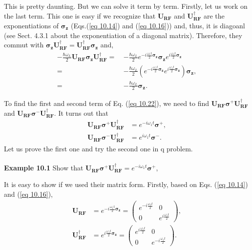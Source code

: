 \documentclass{article}
\begin{document}
This is pretty daunting. But we can solve it term by term. Firstly, let us work on the last
term. This one is easy if we recognize that $\boldsymbol{U_{RF}}$ and $\boldsymbol{U}^\dagger_{\boldsymbol{RF}}$
are the exponentiations of $\boldsymbol{\sigma_z}$ (Eqs.(\ref{eq 10.14}) and (\ref{eq 10.16})) and, thus, it is diagoanl
(see Sect. 4.3.1 about the exponentiation of a diagonal matrix). Therefore, they commut
with $\boldsymbol{\sigma_z}\boldsymbol{U}^\dagger_{\boldsymbol{RF}}=\boldsymbol{U}^\dagger_{\boldsymbol{RF}}\boldsymbol{\sigma_z}$
and,
\begin{align*}\label{eq 10.23}
    -\frac{\hbar\omega_L}{2}\boldsymbol{U_{RF}\sigma_z}\boldsymbol{U}^\dagger_{\boldsymbol{RF}}=\ &
    -\frac{\hbar\omega_L}{2}e^{-i\frac{\omega_1t}{2}\boldsymbol{\sigma_z}}\boldsymbol{\sigma_z}e^{i\frac{\omega_1t}{2}\boldsymbol{\sigma_z}}\\
    =\ &-\frac{\hbar\omega_L}{2}\left(e^{-i\frac{\omega_1t}{2}\boldsymbol{\sigma_z}}e^{i\frac{\omega_1t}{2}\boldsymbol{\sigma_z}}\right)\boldsymbol{\sigma_z},\\
    =\ & -\frac{\hbar\omega_L}{2}\boldsymbol{\sigma_z}.\tag{10.23}
\end{align*}

To find the first and second term of Eq. (\ref{eq 10.22}), we need to find 
$\boldsymbol{U_{RF}\sigma^+}\boldsymbol{U}^\dagger_{\boldsymbol{RF}}$ and
$\boldsymbol{U_{RF}\sigma^-}\boldsymbol{U}^\dagger_{\boldsymbol{RF}}$.
It turns out that
\begin{align*}\label{eq 10.24}
    \boldsymbol{U_{RF}\sigma^+}\boldsymbol{U}^\dagger_{\boldsymbol{RF}}&=e^{-i\omega_1t}\boldsymbol{\sigma^+},\\
    \boldsymbol{U_{RF}\sigma^-}\boldsymbol{U}^\dagger_{\boldsymbol{RF}}&=e^{i\omega_1t}\boldsymbol{\sigma^-}.\tag{10.24}
\end{align*}
Let us prove the first one and try the second one in q problem.\\\\
\textbf{Example 10.1} Show that $\boldsymbol{U_{RF}\sigma^+}\boldsymbol{U}^\dagger_{\boldsymbol{RF}}=e^{-i\omega_1t}\boldsymbol{\sigma^+}$,

It is easy to show if we used their matrix form. Firstly, based on Eqs. (\ref{eq 10.14}) and (\ref{eq 10.16}),
\begin{align*}
    \boldsymbol{U_{RF}}&=e^{-i\frac{\omega_1t}{2}\boldsymbol{\sigma_z}}=\begin{pmatrix}
        e^{-i\frac{\omega_1t}{2}}&0\\0&e^{i\frac{\omega_1t}{2}}
    \end{pmatrix},\\
    \boldsymbol{U}^\dagger_{\boldsymbol{RF}}&=e^{i\frac{\omega_1t}{2}\boldsymbol{\sigma_z}}=\begin{pmatrix}
        e^{i\frac{\omega_1t}{2}}&0\\0&e^{-i\frac{\omega_1t}{2}}
    \end{pmatrix}.
\end{align*}
\end{document}
